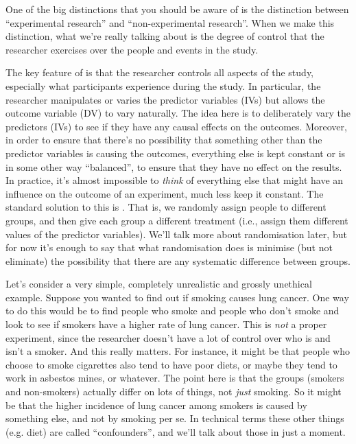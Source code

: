 One of the big distinctions that you should be aware of is the distinction between ``experimental research'' and ``non-experimental research''. When we make this distinction, what we're really talking about is the degree of control that the researcher exercises over the people and events in the study.


The key feature of  is that the researcher controls all aspects of the study, especially what participants experience during the study. In particular, the researcher manipulates or varies the predictor variables (IVs) but allows the outcome variable (DV) to vary naturally. The idea here is to deliberately vary the predictors (IVs) to see if they have any causal effects on the outcomes. Moreover, in order to ensure that there's no possibility that something other than the predictor variables is causing the outcomes, everything else is kept constant or is in some other way ``balanced'', to ensure that they have no effect on the results. In practice, it's almost impossible to {\it think} of everything else that might have an influence on the outcome of an experiment, much less keep it constant. The standard solution to this is . That is, we randomly assign people to different groups, and then give each group a different treatment (i.e., assign them different values of the predictor variables). We'll talk more about randomisation later, but for now it's enough to say that what randomisation does is minimise (but not eliminate) the possibility that there are any systematic difference between groups. 

Let's consider a very simple, completely unrealistic and grossly unethical example. Suppose you wanted to find out if smoking causes lung cancer. One way to do this would be to find people who smoke and people who don't smoke and look to see if smokers have a higher rate of lung cancer. This is {\it not} a proper experiment, since the researcher doesn't have a lot of control over who is and isn't a smoker. And this really matters. For instance, it might be that people who choose to smoke cigarettes also tend to have poor diets, or maybe they tend to work in asbestos mines, or whatever. The point here is that the groups (smokers and non-smokers) actually differ on lots of things, not {\it just} smoking. So it might be that the higher incidence of lung cancer among smokers is caused by something else, and not by smoking per se. In technical terms these other things (e.g. diet) are called ``confounders'', and we'll talk about those in just a moment. 

